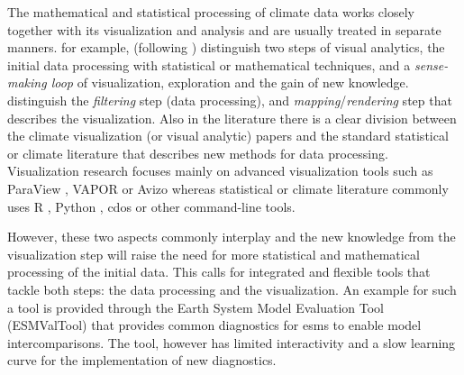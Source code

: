 \begin{refsection}
The mathematical and statistical processing of climate data works closely together with its visualization and analysis and are usually treated in separate manners. \cite{KeimAndrienkoFeketeEtAl2008} for example, (following \cite{Wijk2005}) distinguish two steps of visual analytics, the initial data processing with statistical or mathematical techniques, and a \textit{sense-making loop} of visualization, exploration and the gain of new knowledge. \cite{BoettingerRoeber2019} distinguish the \textit{filtering} step (data processing), and \textit{mapping}/\textit{rendering} step that describes the visualization. Also in the literature there is a clear division between the climate visualization (or visual analytic) papers and the standard statistical or climate literature that describes new methods for data processing. Visualization research focuses mainly on advanced visualization tools such as ParaView \citep{Ayachit2015}, VAPOR \citep{ClyneMininniNortonEtAl2007} or Avizo\addref \citep[e.g.][]{RautenhausBoettingerSiemenEtAl2018, NockeBuschmannDongesEtAl2015, WongShenLeungEtAl2014, BoettingerRoeber2019} whereas statistical or climate literature commonly uses R \citep{RCT2019}, Python \citep{Oliphant2006, PerezGrangerHunter2011}, \glspl{cdo} \citep{Schulzweida2019} or other command-line tools.

However, these two aspects commonly interplay and the new knowledge from the visualization step will raise the need for more statistical and mathematical processing of the initial data. This calls for integrated and flexible tools that tackle both steps: the data processing and the visualization. An example for such a tool is provided through the Earth System Model Evaluation Tool (ESMValTool) \citep{EyringRighiLauerEtAl2016} that provides common diagnostics for \glspl{esm} to enable model intercomparisons. The tool, however has limited interactivity and a slow learning curve for the implementation of new diagnostics.


\end{refsection}
